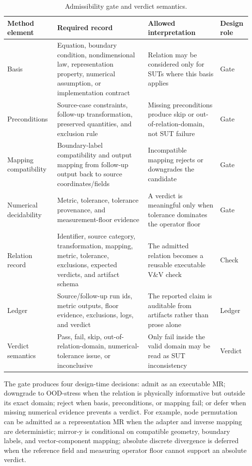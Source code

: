 \documentclass[preprint,12pt,authoryear]{elsarticle}
\begin{document}
\begin{table}[H]
\centering
\caption{Admissibility gate and verdict semantics.}
\label{tab:admissibility-gate}
\footnotesize
\renewcommand{\arraystretch}{0.92}
\setlength{\tabcolsep}{3pt}
\begin{tabularx}{\textwidth}{@{}>{\raggedright\arraybackslash}p{}>{\raggedright\arraybackslash}p{}>{\raggedright\arraybackslash}p{}Y@{}}
\toprule
\textbf{Method element} & \textbf{Required record} & \textbf{Allowed interpretation} & \textbf{Design role} \\
\midrule
Basis & Equation, boundary condition, nondimensional law, representation property, numerical assumption, or implementation contract & Relation may be considered only for SUTs where this basis applies & Gate \\
Preconditions & Source-case constraints, follow-up transformation, preserved quantities, and exclusion rule & Missing preconditions produce skip or out-of-relation-domain, not SUT failure & Gate \\
Mapping compatibility & Boundary-label compatibility and output mapping from follow-up output back to source coordinates/fields & Incompatible mapping rejects or downgrades the candidate & Gate \\
Numerical decidability & Metric, tolerance, tolerance provenance, and measurement-floor evidence & A verdict is meaningful only when tolerance dominates the operator floor & Gate \\
Relation record & Identifier, source category, transformation, mapping, metric, tolerance, exclusions, expected verdicts, and artifact schema & The admitted relation becomes a reusable executable V\&V check & Check \\
Ledger & Source/follow-up run ids, metric outputs, floor evidence, exclusions, logs, and verdict & The reported claim is auditable from artifacts rather than prose alone & Ledger \\
Verdict semantics & Pass, fail, skip, out-of-relation-domain, numerical-tolerance issue, or inconclusive & Only fail inside the valid domain may be read as SUT inconsistency & Verdict \\
\bottomrule
\end{tabularx}
\end{table}

The gate produces four design-time decisions: admit as an executable MR; downgrade to OOD-stress when the relation is physically informative but outside its exact domain; reject when basis, preconditions, or mapping fail; or defer when missing numerical evidence prevents a verdict. For example, node permutation can be admitted as a representation MR when the adapter and inverse mapping are deterministic; mirror-y is conditional on compatible geometry, boundary labels, and vector-component mapping; absolute discrete divergence is deferred when the reference field and measuring operator floor cannot support an absolute verdict.
\end{document}
